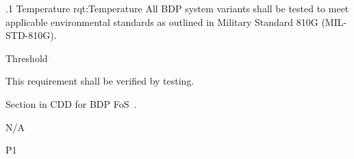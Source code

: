 

\ONERQMTVKSA
{\RqtNumberBase.1}
{Temperature}
{rqt:Temperature}
{All BDP system variants shall be tested to meet applicable environmental standards as outlined in Military Standard 810G (MIL-STD-810G).}
{
	\item [Phase 1] Threshold
}
{This requirement shall be verified by testing.}
{
\item [6.3] Section in CDD for BDP FoS~\cite{ref__BDP_FOS_CDD}.
}
{
	\item N/A
}
{P1}
